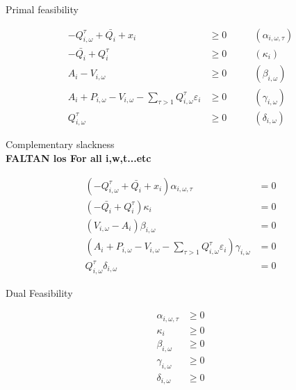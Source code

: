 \documentclass[11pt, letterpaper]{article}
\begin{document}
\smallskip


\begin{flushleft}
Primal feasibility
\end{flushleft}

\begin{align}
    -Q_{i,\omega}^{\tau} + \bar{Q_i} + x_i & \geq 0 & \qquad (\alpha_{i,\omega,\tau}) \\
    -\bar{Q_i} + Q^{\tau}_i & \geq 0 & \qquad (\kappa_i)\\
     A_{i} - V_{i,\omega} & \geq 0 & \qquad (\beta_{i,\omega}) \\
     A_{i} + P_{i,\omega} - V_{i,\omega} - \sum_{\tau>1}Q_{i, \omega}^{\tau}\varepsilon_{i} & \geq 0 & \qquad (\gamma_{i,\omega}) \\
    Q_{i,\omega}^{\tau} & \geq 0 & \qquad (\delta_{i,\omega})
\end{align}

\smallskip

\begin{flushleft}
Complementary slackness\\

\textbf{FALTAN los For all i,w,t...etc}
\end{flushleft}

\begin{align}
    (-Q_{i,\omega}^{\tau} + \bar{Q_i} + x_i)\alpha_{i,\omega,\tau} & = 0 \\
    ( -\bar{Q_i} + Q^{\tau}_i)\kappa_i & = 0 \\
    (V_{i,\omega} - A_{i})\beta_{i,\omega} & = 0 \\
    ( A_{i} + P_{i,\omega} - V_{i,\omega} - \sum_{\tau>1}Q_{i, \omega}^{\tau}\varepsilon_{i})\gamma_{i,\omega} & = 0 \\
    Q_{i,\omega}^{\tau}\delta_{i,\omega} & = 0
\end{align}

\smallskip

\begin{flushleft}
Dual Feasibility
\end{flushleft}

\begin{align}
    \alpha_{i,\omega,\tau} & \geq 0 \\
    \kappa_i & \geq 0 \\
    \beta_{i,\omega} & \geq 0 \\
    \gamma_{i,\omega} & \geq 0 \\
    \delta_{i,\omega} & \geq 0 
\end{align}
\end{document}
